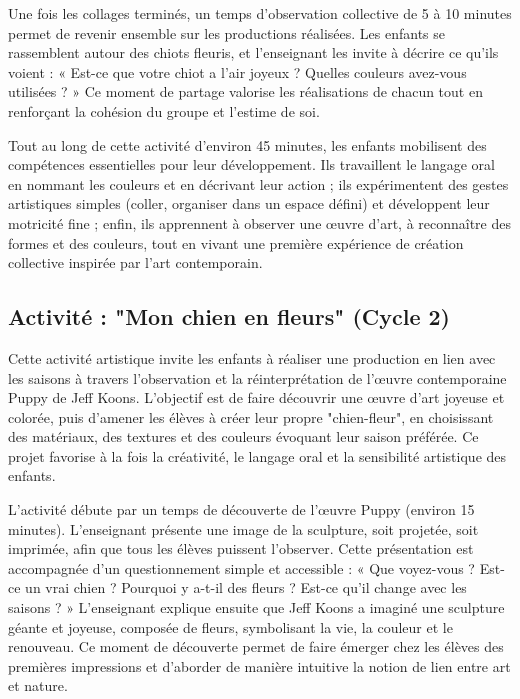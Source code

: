 \documentclass[12pt]{article}
\begin{document}
Une fois les collages terminés, un temps d’observation collective de 5 à 10 minutes permet de revenir ensemble sur les productions réalisées. Les enfants se rassemblent autour des chiots fleuris, et l’enseignant les invite à décrire ce qu’ils voient : « Est-ce que votre chiot a l’air joyeux ? Quelles couleurs avez-vous utilisées ? » Ce moment de partage valorise les réalisations de chacun tout en renforçant la cohésion du groupe et l’estime de soi.

Tout au long de cette activité d’environ 45 minutes, les enfants mobilisent des compétences essentielles pour leur développement. Ils travaillent le langage oral en nommant les couleurs et en décrivant leur action ; ils expérimentent des gestes artistiques simples (coller, organiser dans un espace défini) et développent leur motricité fine ; enfin, ils apprennent à observer une œuvre d’art, à reconnaître des formes et des couleurs, tout en vivant une première expérience de création collective inspirée par l’art contemporain.


\subsection*{Activité : "Mon chien en fleurs" (Cycle 2)}

Cette activité artistique invite les enfants à réaliser une production en lien avec les saisons à travers l’observation et la réinterprétation de l’œuvre contemporaine Puppy de Jeff Koons. L’objectif est de faire découvrir une œuvre d’art joyeuse et colorée, puis d’amener les élèves à créer leur propre "chien-fleur", en choisissant des matériaux, des textures et des couleurs évoquant leur saison préférée. Ce projet favorise à la fois la créativité, le langage oral et la sensibilité artistique des enfants.

L’activité débute par un temps de découverte de l’œuvre Puppy (environ 15 minutes). L’enseignant présente une image de la sculpture, soit projetée, soit imprimée, afin que tous les élèves puissent l’observer. Cette présentation est accompagnée d’un questionnement simple et accessible : « Que voyez-vous ? Est-ce un vrai chien ? Pourquoi y a-t-il des fleurs ? Est-ce qu’il change avec les saisons ? » L’enseignant explique ensuite que Jeff Koons a imaginé une sculpture géante et joyeuse, composée de fleurs, symbolisant la vie, la couleur et le renouveau. Ce moment de découverte permet de faire émerger chez les élèves des premières impressions et d’aborder de manière intuitive la notion de lien entre art et nature.
\end{document}
